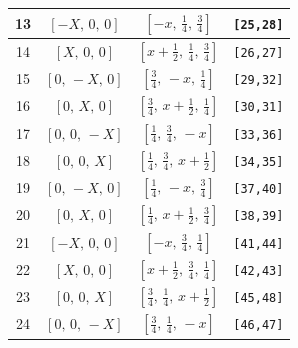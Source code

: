 \documentclass[fleqn,8pt]{jsarticle}
\begin{document}
\begin{longtable}{cccc}
13 & $\left[ - X,\, 0,\, 0 \right]$ & $\left[ - x,\, \frac{1}{4},\, \frac{3}{4} \right]$ & {\tt [25,28]} \\ \hline
14 & $\left[ X,\, 0,\, 0 \right]$ & $\left[ x + \frac{1}{2},\, \frac{1}{4},\, \frac{3}{4} \right]$ & {\tt [26,27]} \\ \hline
15 & $\left[ 0,\, - X,\, 0 \right]$ & $\left[ \frac{3}{4},\, - x,\, \frac{1}{4} \right]$ & {\tt [29,32]} \\ \hline
16 & $\left[ 0,\, X,\, 0 \right]$ & $\left[ \frac{3}{4},\, x + \frac{1}{2},\, \frac{1}{4} \right]$ & {\tt [30,31]} \\ \hline
17 & $\left[ 0,\, 0,\, - X \right]$ & $\left[ \frac{1}{4},\, \frac{3}{4},\, - x \right]$ & {\tt [33,36]} \\ \hline
18 & $\left[ 0,\, 0,\, X \right]$ & $\left[ \frac{1}{4},\, \frac{3}{4},\, x + \frac{1}{2} \right]$ & {\tt [34,35]} \\ \hline
19 & $\left[ 0,\, - X,\, 0 \right]$ & $\left[ \frac{1}{4},\, - x,\, \frac{3}{4} \right]$ & {\tt [37,40]} \\ \hline
20 & $\left[ 0,\, X,\, 0 \right]$ & $\left[ \frac{1}{4},\, x + \frac{1}{2},\, \frac{3}{4} \right]$ & {\tt [38,39]} \\ \hline
21 & $\left[ - X,\, 0,\, 0 \right]$ & $\left[ - x,\, \frac{3}{4},\, \frac{1}{4} \right]$ & {\tt [41,44]} \\ \hline
22 & $\left[ X,\, 0,\, 0 \right]$ & $\left[ x + \frac{1}{2},\, \frac{3}{4},\, \frac{1}{4} \right]$ & {\tt [42,43]} \\ \hline
23 & $\left[ 0,\, 0,\, X \right]$ & $\left[ \frac{3}{4},\, \frac{1}{4},\, x + \frac{1}{2} \right]$ & {\tt [45,48]} \\ \hline
24 & $\left[ 0,\, 0,\, - X \right]$ & $\left[ \frac{3}{4},\, \frac{1}{4},\, - x \right]$ & {\tt [46,47]} \\
\end{longtable}
\renewcommand{\arraystretch}{1.2}
\end{document}
